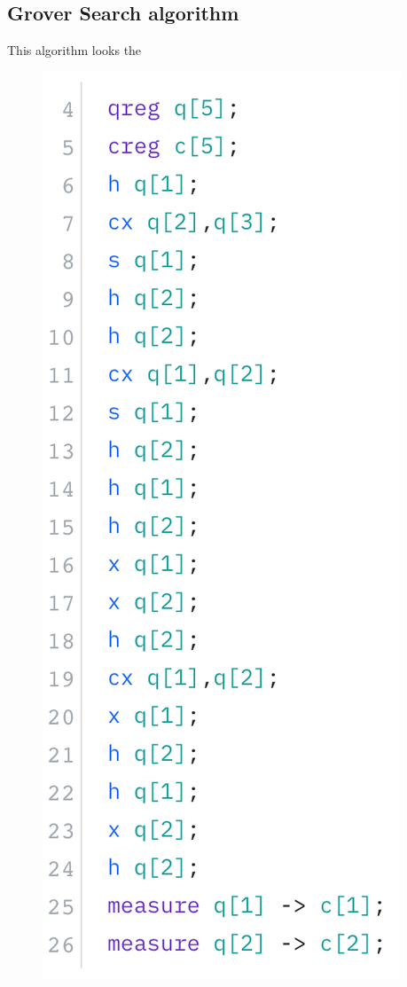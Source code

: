 \documentclass[12pt]{article}
\begin{document}
    \subsection{Grover Search algorithm}
        This algorithm looks the 
        \begin{figure}[ht]
            \centering
            \begin{minipage}{0.35\linewidth}
                \includegraphics[width=\linewidth]{Circuits/grover-code.png}

\end{minipage}
\end{figure}
\end{document}
